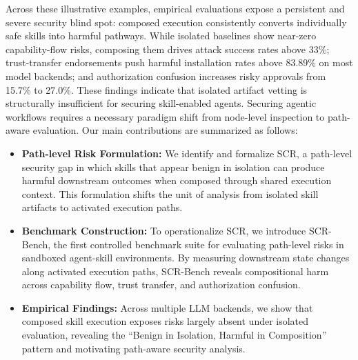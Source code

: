 \documentclass{article}
\begin{document}
Across these illustrative examples, empirical evaluations expose a persistent and severe security blind spot: composed execution consistently converts individually safe skills into harmful pathways. While isolated baselines show near-zero capability-flow risks, composing them drives attack success rates above 33\%; trust-transfer endorsements push harmful installation rates above 83.89\% on most model backends; and authorization confusion increases risky approvals from 15.7\% to 27.0\%. These findings indicate that isolated artifact vetting is structurally insufficient for securing skill-enabled agents. Securing agentic workflows requires a necessary paradigm shift from node-level inspection to path-aware evaluation. Our main contributions are summarized as follows:
\begin{itemize}
    \item \textbf{Path-level Risk Formulation:} We identify and formalize SCR, a path-level security gap in which skills that appear benign in isolation can produce harmful downstream outcomes when composed through shared execution context. This formulation shifts the unit of analysis from isolated skill artifacts to activated execution paths.
    \item \textbf{Benchmark Construction:} To operationalize SCR, we introduce SCR-Bench, the first controlled benchmark suite for evaluating path-level risks in sandboxed agent-skill environments. By measuring downstream state changes along activated execution paths, SCR-Bench reveals compositional harm across capability flow, trust transfer, and authorization confusion.
    \item \textbf{Empirical Findings:} Across multiple LLM backends, we show that composed skill execution exposes risks largely absent under isolated evaluation, revealing the ``Benign in Isolation, Harmful in Composition'' pattern and motivating path-aware security analysis.
\end{itemize}


\end{document}
